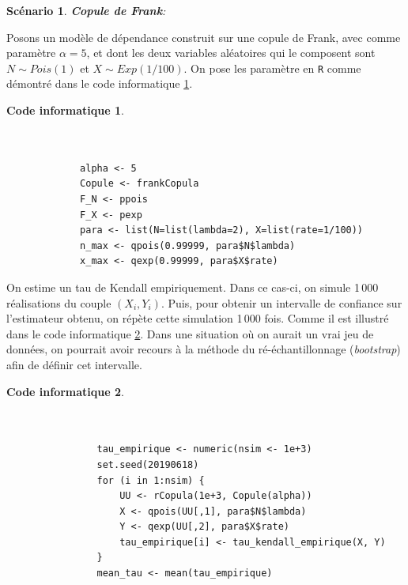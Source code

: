 \documentclass{article}
\newtheorem{code}{Code informatique}
\newtheorem{scenario}{Scénario}
\begin{document}
	 \clearpage
	 \begin{scenario}
	 	\textbf{Copule de Frank}:
	 	\label{scenario_Frank}
	 \end{scenario}
 	 Posons un modèle de dépendance construit sur une copule de Frank, avec comme paramètre $\alpha = 5$, et dont les deux variables aléatoires qui le composent sont $N \sim Pois(1)$ et $X\sim Exp(1/100)$. 
 	 On pose les paramètre en \texttt{R} comme démontré dans le code informatique \ref{code_parametres}. \\
 	 
	 \begin{minipage}[H]{\linewidth}
 	 	\begin{code}\label{code_parametres}
	 	 \begin{verbatim}
	 	 
	 	 
		 	 alpha <- 5
		 	 Copule <- frankCopula
		 	 F_N <- ppois
		 	 F_X <- pexp
		 	 para <- list(N=list(lambda=2), X=list(rate=1/100))
		 	 n_max <- qpois(0.99999, para$N$lambda)
		 	 x_max <- qexp(0.99999, para$X$rate)
	 	 \end{verbatim}
	 	\end{code}
 	\end{minipage}

 	On estime un tau de Kendall empiriquement. Dans ce cas-ci, on simule 1\,000 réalisations du couple $(X_i, Y_i)$. Puis, pour obtenir un intervalle de confiance sur l'estimateur obtenu, on répète cette simulation 1\,000 fois. Comme il est illustré dans le code informatique \ref{code_simul}. Dans une situation où on aurait un vrai jeu de données, on pourrait avoir recours à la méthode du ré-échantillonnage (\textit{bootstrap}) afin de définir cet intervalle. \\

	 \begin{minipage}[H]{\linewidth}
 	 	 	\begin{code}\label{code_simul}
	 		\begin{verbatim}
	 		
	 		
				tau_empirique <- numeric(nsim <- 1e+3)
				set.seed(20190618)
				for (i in 1:nsim) {
				    UU <- rCopula(1e+3, Copule(alpha))
				    X <- qpois(UU[,1], para$N$lambda)
				    Y <- qexp(UU[,2], para$X$rate)
				    tau_empirique[i] <- tau_kendall_empirique(X, Y)
				}
				mean_tau <- mean(tau_empirique)
	 		\end{verbatim}
 			\end{code}
 	\end{minipage}
\end{document}
